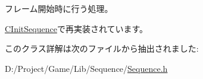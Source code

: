フレーム開始時に行う処理。 



\hyperlink{class_c_init_sequence_a52cb5822b6f2c281f3969fadc61a47fb}{C\+Init\+Sequence}で再実装されています。



このクラス詳解は次のファイルから抽出されました\+:\begin{DoxyCompactItemize}
\item 
D\+:/\+Project/\+Game/\+Lib/\+Sequence/\hyperlink{_sequence_8h}{Sequence.\+h}\end{DoxyCompactItemize}
